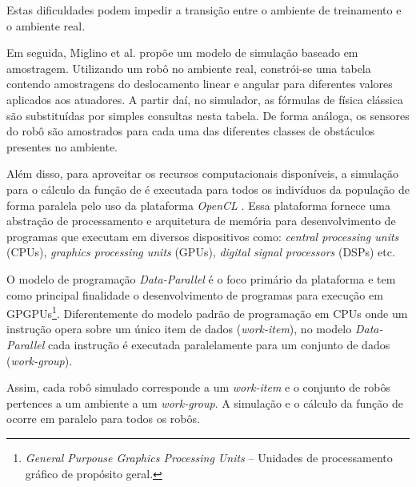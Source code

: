 Estas dificuldades podem impedir a transição entre o ambiente de treinamento e o ambiente real.

Em seguida, Miglino et al. \cite{miglino1996evolving} propõe um modelo de simulação baseado em amostragem. Utilizando um robô no ambiente real, constrói-se uma tabela contendo amostragens do deslocamento linear e angular para diferentes valores aplicados aos atuadores. A partir daí, no simulador, as fórmulas de física clássica são substituídas por simples consultas nesta tabela. De forma análoga, os sensores do robô são amostrados para cada uma das diferentes classes de obstáculos presentes no ambiente.

Além disso, para aproveitar os recursos computacionais disponíveis, a simulação para o cálculo da função de \fitness é executada para todos os indivíduos da população de forma paralela pelo uso da plataforma \textit{OpenCL} \cite{amd2012amdaccelerated}. Essa plataforma fornece uma abstração de processamento e arquitetura de memória para desenvolvimento de programas que executam em diversos dispositivos como: \textit{central processing units} (CPUs), \textit{graphics processing units} (GPUs), \textit{digital signal processors} (DSPs) etc.

O modelo de programação \textit{Data-Parallel} é o foco primário da plataforma e tem como principal finalidade o desenvolvimento de programas para execução em GPGPUs\footnote{\textit{General Purpouse Graphics Processing Units} -- Unidades de processamento gráfico de propósito geral.}. Diferentemente do modelo padrão de programação em CPUs onde um instrução opera sobre um único item de dados (\textit{work-item}), no modelo \textit{Data-Parallel} cada instrução é executada paralelamente para um conjunto de dados (\textit{work-group}).

Assim, cada robô simulado corresponde a um \textit{work-item} e o conjunto de robôs pertences a um ambiente a um \textit{work-group}. A simulação e o cálculo da função de \fitness ocorre em paralelo para todos os robôs.
